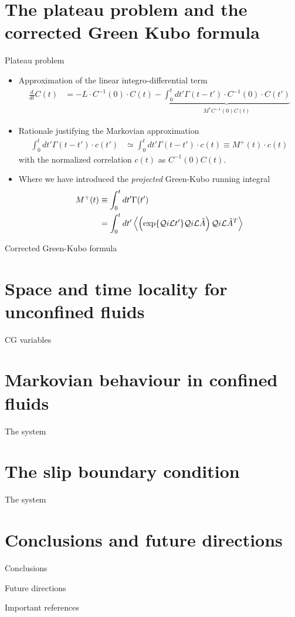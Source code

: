 \documentclass{beamer}
\newcommand{\esc}{\!\cdot\!}
\newcommand{\llangle}{\left\langle}
\newcommand{\rrangle}{\right\rangle}
\begin{document}
\section{The plateau problem and the corrected Green Kubo formula}
\begin{frame}{Plateau problem}
  \begin{itemize}
    \item Approximation of the linear integro-differential term 
      \begin{align}
  \frac{d}{dt}C(t)&=-L\esc C^{-1}(0)\esc C(t)
  -\underbrace{\int_0^tdt' \Gamma(t-t')\esc C^{-1}(0)\esc  C(t')}_{M^* C^{-1}(0)C(t)}
\nonumber
\end{align}
\item Rationale justifying the Markovian approximation 
\begin{align}
  \int_0^tdt' \Gamma(t-t')\esc c(t')&\simeq  \int_0^tdt' \Gamma(t-t')\esc  c(t)
\equiv
M^+(t)\esc c(t)
\nonumber
\end{align}
with the normalized correlation $c(t)$ as $C^{-1}(0)C(t)$.
\item Where we have introduced the \textit{projected} Green-Kubo running integral
\begin{align}
M^+(t)&\equiv  \int_0^tdt' \Gamma(t') 
\nonumber\\
& =\int_0^tdt' \llangle \left(\exp\{{\cal Q}i{\cal   L}t'\}{\cal Q}i{\cal L}\hat{A} \right){\cal Q} i{\cal L}\hat{A}^T\rrangle 
\nonumber
\end{align}
\end{itemize}
\end{frame}

\begin{frame}{Corrected Green-Kubo formula}
\end{frame}

\section{Space and time locality for unconfined fluids}
\begin{frame}{CG variables}
\end{frame}

\section{Markovian behaviour in confined fluids}
\begin{frame}{The system}
\end{frame}

\section{The slip boundary condition}
\begin{frame}{The system}
\end{frame}

\section{Conclusions and future directions}
\begin{frame}{Conclusions}
\end{frame}
\begin{frame}{Future directions}
\end{frame}
\begin{frame}{Important references}
\end{frame}
\end{document}
